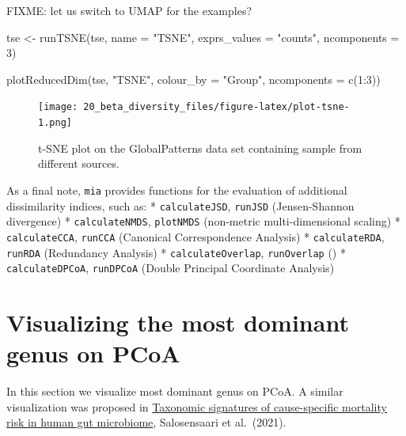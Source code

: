 \documentclass[
]{book}
\newenvironment{Shaded}{\begin{snugshade}}{\end{snugshade}}
\newcommand{\AttributeTok}[1]{\textcolor[rgb]{0.77,0.63,0.00}{#1}}
\newcommand{\DecValTok}[1]{\textcolor[rgb]{0.00,0.00,0.81}{#1}}
\newcommand{\FunctionTok}[1]{\textcolor[rgb]{0.00,0.00,0.00}{#1}}
\newcommand{\NormalTok}[1]{#1}
\newcommand{\OtherTok}[1]{\textcolor[rgb]{0.56,0.35,0.01}{#1}}
\newcommand{\SpecialCharTok}[1]{\textcolor[rgb]{0.00,0.00,0.00}{#1}}
\newcommand{\StringTok}[1]{\textcolor[rgb]{0.31,0.60,0.02}{#1}}
\begin{document}
FIXME: let us switch to UMAP for the examples?

\begin{Shaded}
\begin{Highlighting}[]
\NormalTok{tse }\OtherTok{\textless{}{-}} \FunctionTok{runTSNE}\NormalTok{(tse, }\AttributeTok{name =} \StringTok{"TSNE"}\NormalTok{, }\AttributeTok{exprs\_values =} \StringTok{"counts"}\NormalTok{, }\AttributeTok{ncomponents =} \DecValTok{3}\NormalTok{)}
\end{Highlighting}
\end{Shaded}

\begin{Shaded}
\begin{Highlighting}[]
\FunctionTok{plotReducedDim}\NormalTok{(tse, }\StringTok{"TSNE"}\NormalTok{, }\AttributeTok{colour\_by =} \StringTok{"Group"}\NormalTok{, }\AttributeTok{ncomponents =} \FunctionTok{c}\NormalTok{(}\DecValTok{1}\SpecialCharTok{:}\DecValTok{3}\NormalTok{))}
\end{Highlighting}
\end{Shaded}

\begin{figure}
\centering
\texttt{[image: 20\_beta\_diversity\_files/figure-latex/plot-tsne-1.png]}
\caption{\label{fig:plot-tsne}t-SNE plot on the GlobalPatterns data set containing sample from different sources.}
\end{figure}

As a final note, \texttt{mia} provides functions for the evaluation of additional dissimilarity indices, such as:
* \texttt{calculateJSD}, \texttt{runJSD} (Jensen-Shannon divergence)
* \texttt{calculateNMDS}, \texttt{plotNMDS} (non-metric multi-dimensional scaling)
* \texttt{calculateCCA}, \texttt{runCCA} (Canonical Correspondence Analysis)
* \texttt{calculateRDA}, \texttt{runRDA} (Redundancy Analysis)
* \texttt{calculateOverlap}, \texttt{runOverlap} ()
* \texttt{calculateDPCoA}, \texttt{runDPCoA} (Double Principal Coordinate Analysis)

\hypertarget{visualizing-the-most-dominant-genus-on-pcoa}{%
\section{Visualizing the most dominant genus on PCoA}\label{visualizing-the-most-dominant-genus-on-pcoa}}

In this section we visualize most dominant genus on PCoA. A similar visualization was proposed in \href{https://www.nature.com/articles/s41467-021-22962-y}{Taxonomic signatures of cause-specific mortality risk in human gut microbiome}, Salosensaari et al.~(2021).
\end{document}
